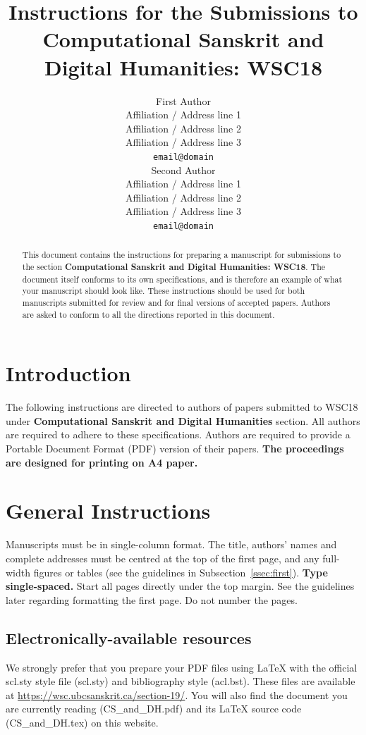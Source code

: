\documentclass[11pt]{article}
\title{Instructions for the Submissions to \\Computational Sanskrit and Digital Humanities: WSC18}
\author{First Author \\
  Affiliation / Address line 1 \\
  Affiliation / Address line 2 \\
  Affiliation / Address line 3 \\
  {\tt email@domain} \\\And
  Second Author \\
  Affiliation / Address line 1 \\
  Affiliation / Address line 2 \\
  Affiliation / Address line 3 \\
  {\tt email@domain} \\}
\date{}
\begin{document}
\maketitle
\linenumbers
\begin{abstract}
  This document contains the instructions for preparing a
  manuscript for submissions to  the section \textbf{Computational Sanskrit and Digital Humanities: WSC18}. 
  The document itself
  conforms to its own specifications, and is therefore an example of
  what your manuscript should look like. These instructions should be
  used for both manuscripts submitted for review and for final versions of
  accepted papers.  Authors are asked to conform to all the directions
  reported in this document.
\end{abstract}

\section{Introduction}
\label{intro}

%
% 

The following instructions are directed to authors of papers submitted
to WSC18 under {\bf Computational Sanskrit and Digital Humanities} section.  All
authors are required to adhere to these specifications. Authors are
required to provide a Portable Document Format (PDF) version of their
papers. \textbf{The proceedings are designed for printing on A4
  paper.}

\section{General Instructions}

Manuscripts must be in single-column format.
The title, authors' names and complete
addresses
must be centred at the top of the first page, and
any full-width figures or tables (see the guidelines in
Subsection~\ref{ssec:first}). {\bf Type single-spaced.}  Start all
pages directly under the top margin. See the guidelines later
regarding formatting the first page.  
Do not number the pages.

\subsection{Electronically-available resources}

We strongly prefer that you prepare your PDF files using \LaTeX{} with
the official scl.sty style file (scl.sty) and bibliography style
(acl.bst). These files are available at
\url{https://wsc.ubcsanskrit.ca/section-19/}.
You will also find the document
you are currently reading (CS\_and\_DH.pdf) and its \LaTeX{} source code
(CS\_and\_DH.tex) on this website.
\end{document}
